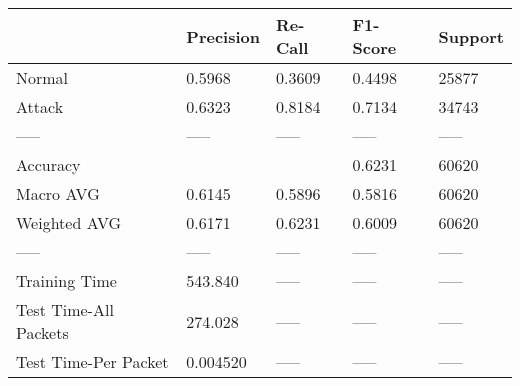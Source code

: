 \begin{tabular}{lllll}
\toprule
{} & Precision & Re-Call & F1-Score & Support \\
\midrule
Normal                &    0.5968 &  0.3609 &   0.4498 &   25877 \\
Attack                &    0.6323 &  0.8184 &   0.7134 &   34743 \\
-----                 &     ----- &   ----- &    ----- &   ----- \\
Accuracy              &           &         &   0.6231 &   60620 \\
Macro AVG             &    0.6145 &  0.5896 &   0.5816 &   60620 \\
Weighted AVG          &    0.6171 &  0.6231 &   0.6009 &   60620 \\
-----                 &     ----- &   ----- &    ----- &   ----- \\
Training Time         &   543.840 &   ----- &    ----- &   ----- \\
Test Time-All Packets &   274.028 &   ----- &    ----- &   ----- \\
Test Time-Per Packet  &  0.004520 &   ----- &    ----- &   ----- \\
\bottomrule
\end{tabular}

